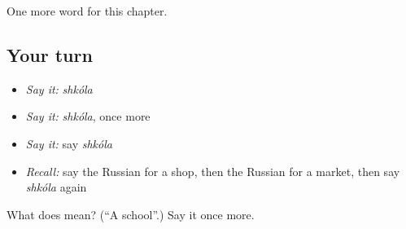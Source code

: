 \begin{grammarlens}[title={What you've built}]
One more word for this chapter.
\end{grammarlens}

\subsection*{Your turn}
\begin{itemize}
\raggedright
  \item \emph{Say it:} \emph{shkóla}
  \item \emph{Say it:} \emph{shkóla}, once more
  \item \emph{Say it:} say \emph{shkóla}
  \item \emph{Recall:} say the Russian for a shop, then the Russian for a market, then say \emph{shkóla} again
\end{itemize}

\begin{tcolorbox}[breakable,colback=teal!4,colframe=teal!35!black,title={Before you move on}]
What does  mean? (\textquotedblleft{}A school\textquotedblright{}.) Say it once more.
\end{tcolorbox}
